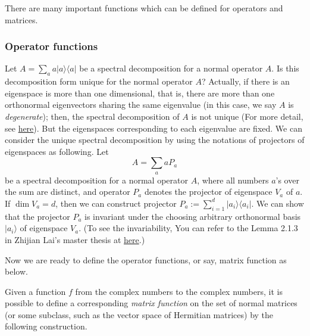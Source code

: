 
There are many important functions which can be defined for operators and matrices. 

\subsubsection{Operator functions}

Let $A=\sum_{a} a|a\rangle\langle a|$ be a spectral decomposition for a normal operator $A$. Is this decomposition form unique for the normal operator $A$? Actually, if there is an eigenspace is more than one dimensional, that is, there are more than one orthonormal eigenvectors sharing the same eigenvalue (in this case, we say $A$ is \textit{degenerate}); then, the spectral decomposition of $A$ is not unique (For more detail, see \href{https://physics.stackexchange.com/questions/576287/uniqueness-of-spectral-decomposition}{here}). But the eigenspaces corresponding to each eigenvalue are fixed. We can consider the unique spectral decomposition by using the notations of projectors of eigenspaces as following. Let 
$$A=\sum_{a} a P_{a}$$
be a spectral decomposition for a normal operator $A$, where all numbers $a$'s over the sum are distinct, and operator $P_{a}$ denotes the projector of eigenspace $V_a$ of $a.$ If $\dim V_a =d$, then we can construct projector $P_a:= \sum_{i=1}^{d} |a_{i}\rangle\langle a_{i}|$. We can show that the projector $P_a$ is invariant under the choosing arbitrary orthonormal basis $|a_{i}\rangle$ of eigenspace $V_a$. (To see the invariability, You can refer to the Lemma 2.1.3 in Zhijian Lai's master thesis at \href{https://galvinlai.github.io/files/doc/master_thesis_2021.pdf}{here}.)

Now we are ready to define the operator functions, or say, matrix function as below.

Given a function $f$ from the complex numbers to the complex numbers, it is possible to define a corresponding \textit{matrix function} on the set of normal matrices (or some subclass, such as the vector space of Hermitian matrices) by the following construction. 

